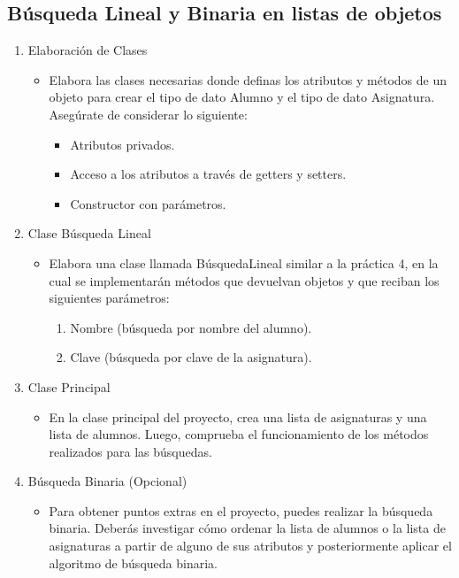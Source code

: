 \documentclass{report}
\begin{document}
\subsection*{Búsqueda Lineal y Binaria en listas de objetos}
\begin{enumerate}
    \item Elaboración de Clases
    \begin{itemize}
        \item Elabora las clases necesarias donde definas los atributos y métodos de un objeto para crear el tipo de dato Alumno y el tipo de dato Asignatura. Asegúrate de considerar lo siguiente:
        \begin{itemize}
            \item Atributos privados.
            \item Acceso a los atributos a través de getters y setters.
            \item Constructor con parámetros.
        \end{itemize}
    \end{itemize}

    \item Clase Búsqueda Lineal
    \begin{itemize}
        \item Elabora una clase llamada BúsquedaLineal similar a la práctica 4, en la cual se implementarán métodos que devuelvan objetos y que reciban los siguientes parámetros:
        \begin{enumerate}
            \item Nombre (búsqueda por nombre del alumno).
            \item Clave (búsqueda por clave de la asignatura).
        \end{enumerate}
    \end{itemize}

    \item Clase Principal
    \begin{itemize}
        \item En la clase principal del proyecto, crea una lista de asignaturas y una lista de alumnos. Luego, comprueba el funcionamiento de los métodos realizados para las búsquedas.
    \end{itemize}

    \item Búsqueda Binaria (Opcional)
    \begin{itemize}
        \item Para obtener puntos extras en el proyecto, puedes realizar la búsqueda binaria. Deberás investigar cómo ordenar la lista de alumnos o la lista de asignaturas a partir de alguno de sus atributos y posteriormente aplicar el algoritmo de búsqueda binaria.
    \end{itemize}
\end{enumerate}
\end{document}
